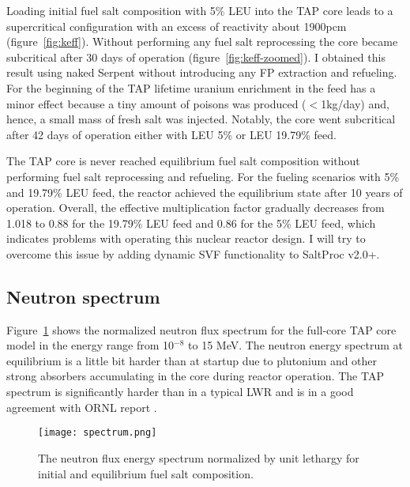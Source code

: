 Loading initial fuel salt composition with 5\% \gls{LEU} into the \gls{TAP} 
core leads to a supercritical configuration with an excess of reactivity about 
1900pcm (figure~\ref{fig:keff}). Without performing any fuel salt reprocessing 
the core became subcritical after 30 days of operation 
(figure~\ref{fig:keff-zoomed}). I obtained this result using naked Serpent 
without introducing any \gls{FP} extraction and refueling. For the beginning 
of the \gls{TAP} lifetime uranium enrichment in the feed has a minor effect 
because a tiny amount of poisons was produced ($<$1kg/day) and, hence, a small 
mass of fresh salt was injected. Notably, the core went subcritical after 42 
days of operation either with \gls{LEU} 5\% or \gls{LEU} 19.79\% feed.

The \gls{TAP} core is never reached equilibrium fuel salt composition without 
performing fuel salt reprocessing and refueling. For the fueling scenarios 
with 5\% and 19.79\% \gls{LEU} feed, the reactor achieved the equilibrium 
state after 10 years of operation. Overall, the effective multiplication 
factor gradually decreases from 1.018 to 0.88 for the 19.79\% \gls{LEU} feed 
and 0.86 for the 5\% \gls{LEU} feed, which indicates problems with operating 
this nuclear reactor design. I will try to overcome this issue by adding 
dynamic \gls{SVF} functionality to SaltProc v2.0+.

\subsection{Neutron spectrum}
Figure~\ref{fig:spectrum} shows the normalized neutron flux spectrum for the 
full-core \gls{TAP} core model in the energy range from 10$^{-8}$ to 15 MeV. 
The neutron energy spectrum at equilibrium is a little bit harder than at 
startup due to plutonium and other strong absorbers accumulating in the 
core during reactor operation. The \gls{TAP} spectrum is significantly 
harder than in a typical \gls{LWR} and is in a good agreement with 
\gls{ORNL} report \cite{betzler_assessment_2017}.
\begin{figure}[htp!] %
	\centering
	\texttt{[image: spectrum.png]}
	\caption{The neutron flux energy spectrum normalized by unit lethargy 
		for initial and equilibrium fuel salt composition.}
	\label{fig:spectrum}
\end{figure}
